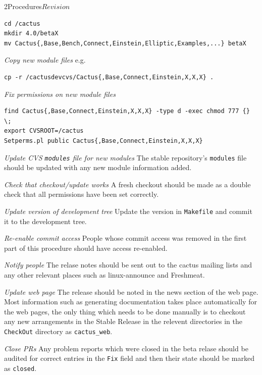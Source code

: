 \begin{cactuspart}{2}{Procedures}{}{$Revision$}
\begin{Lentry}
\begin{verbatim}
cd /cactus
mkdir 4.0/betaX
mv Cactus{,Base,Bench,Connect,Einstein,Elliptic,Examples,...} betaX
\end{verbatim}

\item[{\em Copy new module files}]
e.g.
\begin{verbatim}
cp -r /cactusdevcvs/Cactus{,Base,Connect,Einstein,X,X,X} .
\end{verbatim}
\item[{\em Fix permissions on new module files}]
\begin{verbatim}
find Cactus{,Base,Connect,Einstein,X,X,X} -type d -exec chmod 777 {} \;
export CVSROOT=/cactus
Setperms.pl public Cactus{,Base,Connect,Einstein,X,X,X}
\end{verbatim}
\item[{\em Update CVS {\tt modules} file for new modules}]
The stable repository's {\tt modules} file should be updated with any
new module information added. 
\item[{\em Check that checkout/update works}]
A fresh checkout should be made as a double check that all permissions 
have been set correctly.
\item[{\em Update version of development tree}]
Update the version in {\tt Makefile} and commit it to the development
tree.
\item[{\em Re-enable commit access}]
People whose commit access was removed in the first part of this
procedure should have access re-enabled.
\item[{\em Notify people}]
The relase notes should be sent out to the cactus mailing lists and
any other relevant places such as linux-announce and Freshmeat.
\item[{\em Update web page}]
The release should be noted in the news section of the web page.
Most information such as generating documentation takes place automatically 
for the web pages, the only thing which needs to be done manually is to
checkout any new arrangements in the Stable Release in the relevent 
directories in the {\tt CheckOut} directory as {\tt cactus\_web}.
\item[{\em Close PRs}]
Any problem reports which were closed in the beta relase should be
audited for correct entries in the {\tt Fix} field and then their
state should be marked as {\tt closed}.
\end{Lentry}


\end{cactuspart}

